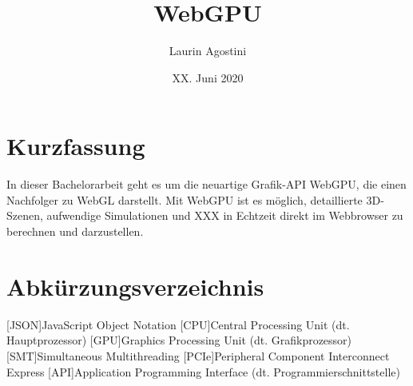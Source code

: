 \documentclass[oneside]{ausarbeitung}
\begin{document}



\title{WebGPU}

\author{Laurin Agostini}

\date{XX. Juni 2020}

\maketitle
\cleardoublepage

\setcounter{page}{1}


\makeaffirmation
\cleardoublepage

\chapter*{Kurzfassung}
In dieser Bachelorarbeit geht es um die neuartige Grafik-API WebGPU, die einen Nachfolger zu WebGL darstellt. Mit WebGPU ist es möglich, detaillierte 3D-Szenen, aufwendige Simulationen und XXX in Echtzeit direkt im Webbrowser zu berechnen und darzustellen. 

\cleardoublepage
{}
\tableofcontents

\listoffigures

\listoftables

\chapter*{Abkürzungsverzeichnis}
\begin{acronym}[JSON]  %

[JSON]{JavaScript Object Notation}
[CPU]{Central Processing Unit (dt. Hauptprozessor)}
[GPU]{Graphics Processing Unit (dt. Grafikprozessor)}
[SMT]{Simultaneous Multithreading}
[PCIe]{Peripheral Component Interconnect Express}
[API]{Application Programming Interface (dt. Programmierschnittstelle)}
\end{acronym}
\cleardoublepage
{}
\setcounter{page}{1}
\end{document}
